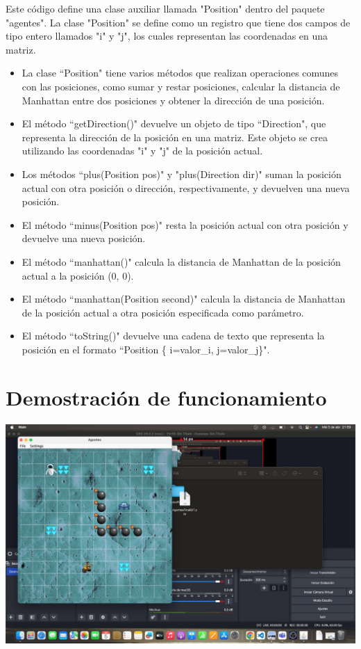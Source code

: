 \documentclass{article}
\begin{document}
Este código define una clase auxiliar llamada "Position" dentro del paquete "agentes". La clase "Position" se define como un registro que tiene dos campos de tipo entero llamados "i" y "j", los cuales representan las coordenadas en una matriz.
\begin{itemize}
	\item La clase ``Position" tiene varios métodos que realizan operaciones comunes con las posiciones, como sumar y restar posiciones, calcular la distancia de Manhattan entre dos posiciones y obtener la dirección de una posición.

	\item El método ``getDirection()" devuelve un objeto de tipo ``Direction", que representa la dirección de la posición en una matriz. Este objeto se crea utilizando las coordenadas "i" y "j" de la posición actual.
	
	\item Los métodos ``plus(Position pos)" y "plus(Direction dir)" suman la posición actual con otra posición o dirección, respectivamente, y devuelven una nueva posición.
	
	\item El método ``minus(Position pos)" resta la posición actual con otra posición y devuelve una nueva posición.
	
	\item El método ``manhattan()" calcula la distancia de Manhattan de la posición actual a la posición (0, 0).
	
	\item El método ``manhattan(Position second)" calcula la distancia de Manhattan de la posición actual a otra posición especificada como parámetro.
	
	\item El método ``toString()" devuelve una cadena de texto que representa la posición en el formato ``Position \{ i=valor\_i, j=valor\_j\}".
\end{itemize}
\section{Demostración de funcionamiento}
\includegraphics[scale=0.20]{demo.jpeg}
\end{document}

